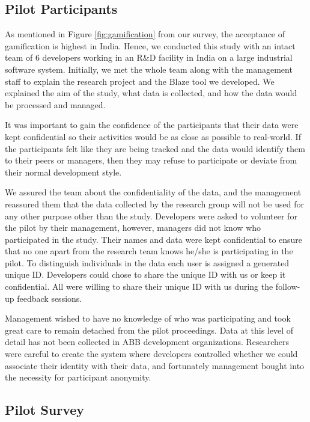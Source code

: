 \documentclass{sig-alternate}
\begin{document}
\subsection{Pilot Participants}

As mentioned in Figure \ref{fig:gamification} from our survey, the acceptance of gamification is highest in India. Hence, we conducted this study with an intact team of 6 developers working in an R\&D facility in India on a large industrial software system. Initially, we met the whole team along with the management staff to explain the research project and the Blaze tool we developed. We  explained the aim of the study, what data is collected, and how the data would be processed and managed. 

It was important to gain the confidence of the participants that their data were kept confidential so their activities would be as close as possible to real-world. If the participants felt like they are being tracked and the data would identify them to their peers or managers, then they may refuse to participate or deviate from their normal development style.

We  assured the team about the confidentiality of the data, and the management reassured them that the data collected by the research group will not be used for any other purpose other than the study.  Developers were asked to volunteer for the pilot by their management, however, managers did not know who participated in the study. Their names and data were kept confidential to ensure that no one apart from the research team knows he/she is participating in the pilot.  To distinguish individuals in the data each user is assigned a generated unique ID.  Developers could chose to share the unique ID with us or keep it confidential.  All were willing to share their unique ID with us during the follow-up feedback sessions.   

Management wished to have no knowledge of who was participating and took great care to remain detached from the pilot proceedings.  Data at this level of detail has not been collected in ABB development organizations.  Researchers were careful to create the system where developers controlled whether we could associate their identity with their data, and fortunately management bought into the necessity for participant anonymity.

\subsection{Pilot Survey}
\end{document}
